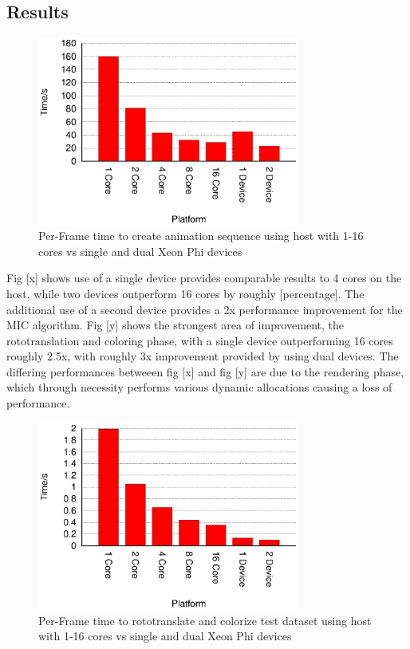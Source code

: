 \documentclass[runningheads,a4paper]{llncs}
\begin{document}
\subsection{Results}
\label{sect:results}

\begin{figure}
\centering
\includegraphics[height=6.2cm]{TotalTime}
\caption{Per-Frame time to create animation sequence using host with 1-16 cores vs single and dual Xeon Phi devices}
\label{fig:totaltimes}
\end{figure}

Fig [x] shows use of a single device provides comparable results to 4 cores on the host, while two devices outperform 16 cores by 
roughly [percentage]. The additional use of a second device provides a 2x performance improvement for the MIC algorithm. 
Fig [y] shows the strongest area of improvement, the rototranslation and coloring phase, with a single device outperforming 16 
cores roughly 2.5x, with roughly 3x improvement provided by using dual devices. The differing performances betweeen 
fig [x] and fig [y] are due to the rendering phase, which through necessity performs various dynamic allocations causing a loss 
of performance. 

\begin{figure}
\centering
\includegraphics[height=6.2cm]{Rotocol}
\caption{Per-Frame time to rototranslate and colorize test dataset using host with 1-16 cores vs single and dual Xeon Phi devices}
\label{fig:rotocol}
\end{figure}
\end{document}
